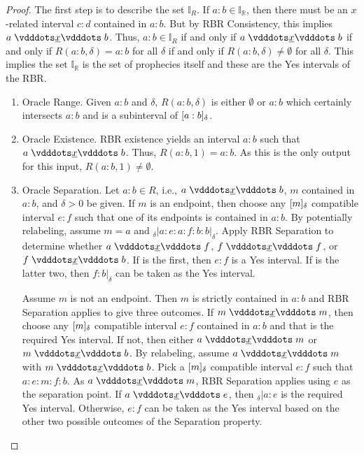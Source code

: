 \documentclass[12pt]{article}
\begin{document}
\begin{proof}

    The first step is to describe the set $\mathbb{I}_R$. If $a:b \in \mathbb{I_R}$, then there must be an $x$-related interval $c:d$ contained in $a:b$. But by RBR Consistency, this implies $a \xrel b$. Thus, $a:b \in \mathbb{I}_R$ if and only if $a \xrel b$ if and only if $R(a:b, \delta) = a:b$ for all $\delta$ if and only if $R(a:b, \delta) \neq \emptyset$ for all $\delta$. This implies the set $\mathbb{I_R}$ is the set of prophecies itself and these are the Yes intervals of the RBR. 

    \begin{enumerate}
        \item Oracle Range. Given $a:b$ and $\delta$, $R(a:b, \delta)$ is either $\emptyset$ or $a:b$ which certainly intersects $a:b$ and is a subinterval  of $[a:b]_{\delta}$.
        \item Oracle Existence. RBR existence yields an interval $a:b$ such that $a \xrel b$. Thus, $R(a:b, 1) = a:b$. As this is the only output for this input, $R(a:b, 1) \neq \emptyset$. 
        \item Oracle Separation. Let $a:b \in R$, i.e., $a \xrel b$, $m$ contained in $a:b$, and $\delta >0$ be given. If $m$ is an endpoint, then choose any $[m]_{\delta}$ compatible interval $e:f$ such that one of its endpoints is contained in $a:b$. By potentially relabeling, assume $m =a$ and ${}_\delta |a:e:a:f:b:b|_\delta$. Apply RBR Separation to determine whether $a \xrel f$, $f \xrel f$, or $f \xrel b$. If is the first, then $e:f$ is a Yes interval. If is the latter two, then $f:b|_\delta$ can be taken as the Yes interval. 

        Assume $m$ is not an endpoint. Then $m$ is strictly contained in $a:b$ and RBR Separation applies to give three outcomes. If $m \xrel m$, then choose any $[m]_{\delta}$ compatible interval $e:f$  contained in $a:b$ and that is the required Yes interval. If not, then either $a \xrel m$ or $m \xrel b$. By relabeling, assume $a \xrel m$ with \sout{$m \xrel b$}. Pick a $[m]_{\delta}$ compatible interval $e:f$ such that $a:e:m:f:b$. As $a \xrel m$, RBR Separation applies using $e$ as the separation point. If $a \xrel e$, then ${}_\delta | a:e$ is the required Yes interval. Otherwise, $e:f$ can be taken as the Yes interval based on the other two possible outcomes of the Separation property. 


\end{enumerate}
\end{proof}
\end{document}
